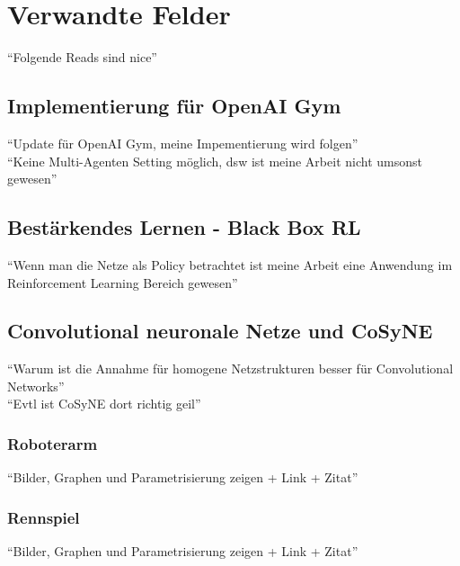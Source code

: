     \section{Verwandte Felder}
        ``Folgende Reads sind nice''
        \subsection{Implementierung für OpenAI Gym}
            ``Update für OpenAI Gym, meine Impementierung wird folgen'' \\
            ``Keine Multi-Agenten Setting möglich, dsw ist meine Arbeit nicht umsonst gewesen''
        \subsection{Bestärkendes Lernen - Black Box RL}
            ``Wenn man die Netze als Policy betrachtet ist meine Arbeit eine Anwendung im Reinforcement Learning Bereich gewesen''
        \subsection{Convolutional neuronale Netze und CoSyNE}
            ``Warum ist die Annahme für homogene Netzstrukturen besser für Convolutional Networks'' \\
            ``Evtl ist CoSyNE dort richtig geil''
            \subsubsection*{Roboterarm}
                ``Bilder, Graphen und Parametrisierung zeigen + Link + Zitat''
            \subsubsection*{Rennspiel}
                ``Bilder, Graphen und Parametrisierung zeigen + Link + Zitat''

